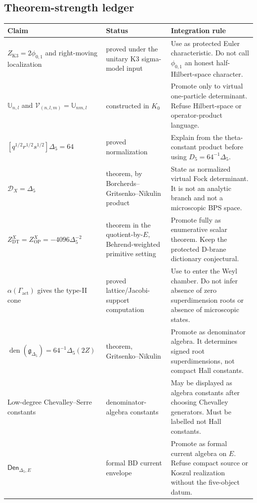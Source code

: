 \subsection{Theorem-strength ledger}

\begin{center}
\small
\begin{tabular}{p{}p{}p{}}
\hline
Claim & Status & Integration rule \\
\hline
\(Z_{\mathrm{K3}}=2\phi_{0,1}\) and right-moving localization &
proved under the unitary K3 sigma-model input &
Use as protected Euler characteristic.  Do not call
\(\phi_{0,1}\) an honest half-Hilbert-space character. \\
\(\mathbb U_{n,l}\) and \(\mathcal V_{(n,l,m)}=\mathbb U_{nm,l}\) &
constructed in \(K_0\) &
Promote only to virtual one-particle determinant.  Refuse Hilbert-space
or operator-product language. \\
\([q^{1/2}r^{1/2}s^{1/2}]\Delta_5=64\) &
proved normalization &
Explain from the theta-constant product before using \(D_5=64^{-1}\Delta_5\). \\
\(\mathcal D_X=\Delta_5\) &
theorem, by Borcherds--Gritsenko--Nikulin product &
State as normalized virtual Fock determinant.  It is not an analytic
branch and not a microscopic BPS space. \\
\(Z^X_{\mathrm{DT}}=Z^X_{\mathrm{OP}}=-4096\Delta_5^{-2}\) &
theorem in the quotient-by-\(E\), Behrend-weighted primitive setting &
Promote fully as enumerative scalar theorem.  Keep the protected
D-brane dictionary conjectural. \\
\(\alpha(\Gamma_{\mathrm{act}})\) gives the type-II cone &
proved lattice/Jacobi-support computation &
Use to enter the Weyl chamber.  Do not infer absence of zero
superdimension roots or absence of microscopic states. \\
\(\operatorname{den}(\mathfrak g_{\Delta_5})=64^{-1}\Delta_5(2Z)\) &
theorem, Gritsenko--Nikulin &
Promote as denominator algebra.  It determines signed root
superdimensions, not compact Hall constants. \\
Low-degree Chevalley--Serre constants &
denominator-algebra constants &
May be displayed as algebra constants after choosing Chevalley
generators.  Must be labelled not Hall constants. \\
\(\mathsf{Den}_{\Delta_5,E}\) &
formal BD current envelope &
Promote as formal current algebra on \(E\).  Refuse compact source or
Koszul realization without the five-object datum. \\

\end{tabular}
\end{center}
